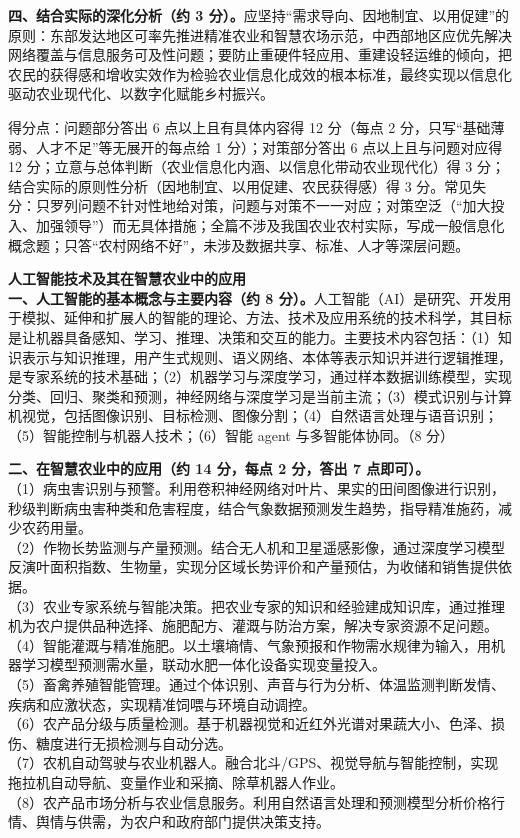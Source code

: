 \documentclass[a4paper,11pt]{article}
\begin{document}
\textbf{四、结合实际的深化分析（约 3 分）。}应坚持“需求导向、因地制宜、以用促建”的原则：东部发达地区可率先推进精准农业和智慧农场示范，中西部地区应优先解决网络覆盖与信息服务可及性问题；要防止重硬件轻应用、重建设轻运维的倾向，把农民的获得感和增收实效作为检验农业信息化成效的根本标准，最终实现以信息化驱动农业现代化、以数字化赋能乡村振兴。

\begin{analysis}得分点：问题部分答出 6 点以上且有具体内容得 12 分（每点 2 分，只写“基础薄弱、人才不足”等无展开的每点给 1 分）；对策部分答出 6 点以上且与问题对应得 12 分；立意与总体判断（农业信息化内涵、以信息化带动农业现代化）得 3 分；结合实际的原则性分析（因地制宜、以用促建、农民获得感）得 3 分。常见失分：只罗列问题不针对性地给对策，问题与对策不一一对应；对策空泛（“加大投入、加强领导”）而无具体措施；全篇不涉及我国农业农村实际，写成一般信息化概念题；只答“农村网络不好”，未涉及数据共享、标准、人才等深层问题。\end{analysis}

\q \textbf{人工智能技术及其在智慧农业中的应用}\\
\textbf{一、人工智能的基本概念与主要内容（约 8 分）。}人工智能（AI）是研究、开发用于模拟、延伸和扩展人的智能的理论、方法、技术及应用系统的技术科学，其目标是让机器具备感知、学习、推理、决策和交互的能力。主要技术内容包括：（1）知识表示与知识推理，用产生式规则、语义网络、本体等表示知识并进行逻辑推理，是专家系统的技术基础；（2）机器学习与深度学习，通过样本数据训练模型，实现分类、回归、聚类和预测，神经网络与深度学习是当前主流；（3）模式识别与计算机视觉，包括图像识别、目标检测、图像分割；（4）自然语言处理与语音识别；（5）智能控制与机器人技术；（6）智能 agent 与多智能体协同。（8 分）

\textbf{二、在智慧农业中的应用（约 14 分，每点 2 分，答出 7 点即可）。}\\
（1）病虫害识别与预警。利用卷积神经网络对叶片、果实的田间图像进行识别，秒级判断病虫害种类和危害程度，结合气象数据预测发生趋势，指导精准施药，减少农药用量。\\
（2）作物长势监测与产量预测。结合无人机和卫星遥感影像，通过深度学习模型反演叶面积指数、生物量，实现分区域长势评价和产量预估，为收储和销售提供依据。\\
（3）农业专家系统与智能决策。把农业专家的知识和经验建成知识库，通过推理机为农户提供品种选择、施肥配方、灌溉与防治方案，解决专家资源不足问题。\\
（4）智能灌溉与精准施肥。以土壤墒情、气象预报和作物需水规律为输入，用机器学习模型预测需水量，联动水肥一体化设备实现变量投入。\\
（5）畜禽养殖智能管理。通过个体识别、声音与行为分析、体温监测判断发情、疾病和应激状态，实现精准饲喂与环境自动调控。\\
（6）农产品分级与质量检测。基于机器视觉和近红外光谱对果蔬大小、色泽、损伤、糖度进行无损检测与自动分选。\\
（7）农机自动驾驶与农业机器人。融合北斗/GPS、视觉导航与智能控制，实现拖拉机自动导航、变量作业和采摘、除草机器人作业。\\
（8）农产品市场分析与农业信息服务。利用自然语言处理和预测模型分析价格行情、舆情与供需，为农户和政府部门提供决策支持。
\end{document}
